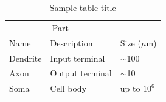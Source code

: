 \documentclass{article}
\begin{document}
\begin{table}
	\caption{Sample table title}
	\centering
	\begin{tabular}{lll}
		\toprule
		\multicolumn{2}{c}{Part}                   \\
		\cmidrule(r){1-2}
		Name     & Description     & Size ($\mu$m) \\
		\midrule
		Dendrite & Input terminal  & $\sim$100     \\
		Axon     & Output terminal & $\sim$10      \\
		Soma     & Cell body       & up to $10^6$  \\
		\bottomrule
	\end{tabular}
	\label{tab:table}
\end{table}



\end{document}
